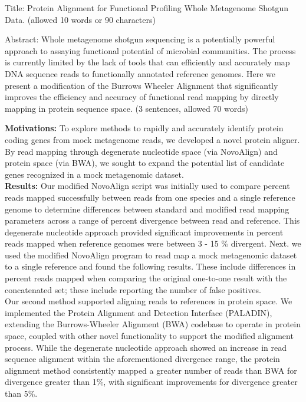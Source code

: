 Title: Protein Alignment for Functional Profiling Whole Metagenome Shotgun Data. (allowed 10 words or 90 characters)

Abstract: Whole metagenome shotgun sequencing is a potentially powerful approach to assaying functional potential of microbial communities.  The process is currently limited by the lack of tools that can efficiently and accurately map DNA sequence reads to functionally annotated reference genomes.  Here we present a modification of the Burrows Wheeler Alignment that significantly improves the efficiency and accuracy of functional read mapping by directly mapping in protein sequence space. (3 sentences, allowed 70 words)

\textbf{Motivations:} To explore methods to rapidly and accurately identify protein coding genes from mock metagenome reads, we developed a novel protein aligner. By read mapping through degenerate nucleotide space (via NovoAlign) and protein space (via BWA), we sought to expand the potential list of candidate genes recognized in a mock metagenomic dataset.\\

\textbf{Results:} Our modified NovoAlign script was initially used to compare percent reads mapped successfully between reads from one species and a single reference genome to determine differences between standard and modified read mapping parameters across a range of percent divergence between read and reference. This degenerate nucleotide approach provided significant improvements in percent reads mapped when reference genomes were between 3 - 15 \% divergent. Next. we used the modified NovoAlign program to read map a mock metagenomic dataset to a single reference and found the following results. These include differences in percent reads mapped when comparing the original one-to-one result with the concatenated set; these include reporting the number of false positives. \\

Our second method supported aligning reads to references in protein space.  We implemented the Protein Alignment and Detection Interface (PALADIN), extending the Burrows-Wheeler Alignment (BWA) codebase to operate in protein space, coupled with other novel functionality to support the modified alignment process.  While  the degenerate nucleotide approach showed an increase in read sequence alignment within the aforementioned divergence range, the protein alignment method consistently mapped a greater number of reads than BWA for divergence greater than 1\%, with significant improvements for divergence greater than 5\%.  \\

